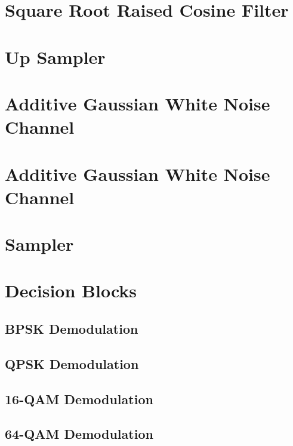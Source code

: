 \documentclass[]{article}
\begin{document}
\section{Square Root Raised Cosine Filter}
\label{app:sqrt_raised_cosine}

\cleardoublepage
\newpage

\section{Up Sampler}
\label{app:impulse_train}

\cleardoublepage
\newpage

\section{Additive Gaussian White Noise Channel}
\label{app:awgn_channel}

\cleardoublepage
\newpage

\section{Additive Gaussian White Noise Channel}
\label{app:awgn_channel}

\cleardoublepage
\newpage

\section{Sampler}
\label{app:sampler}

\cleardoublepage
\newpage

\section{Decision Blocks}
\label{app:dblocks}
\subsection{BPSK Demodulation}
\label{app:bpsk_demod}

\cleardoublepage
\newpage

\subsection{QPSK Demodulation}
\label{app:qpsk_demod}

\cleardoublepage
\newpage

\subsection{16-QAM Demodulation}
\label{app:qam_16_demod}

\cleardoublepage
\newpage

\subsection{64-QAM Demodulation}
\label{app:qam_64_demod}

\cleardoublepage
\newpage
\end{document}
